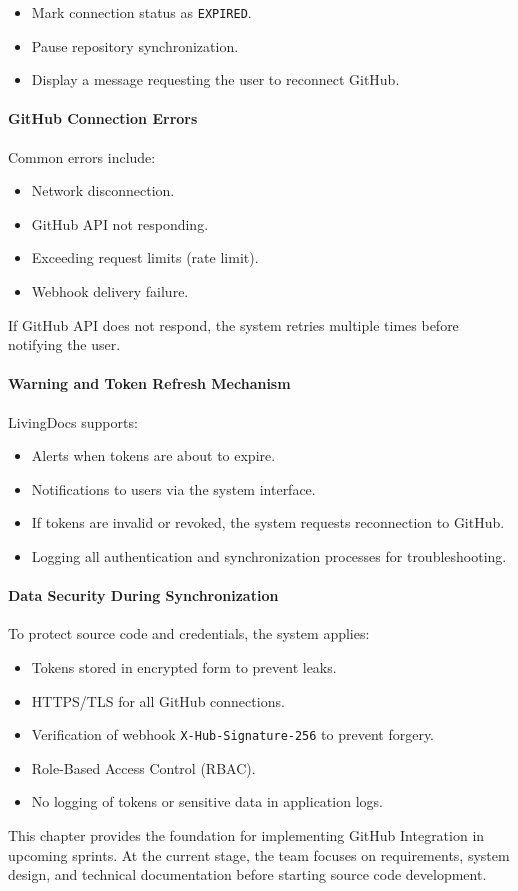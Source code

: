 \begin{itemize}
    \item Mark connection status as \texttt{EXPIRED}.
    \item Pause repository synchronization.
    \item Display a message requesting the user to reconnect GitHub.
\end{itemize}

\paragraph{GitHub Connection Errors}

Common errors include:

\begin{itemize}
    \item Network disconnection.
    \item GitHub API not responding.
    \item Exceeding request limits (rate limit).
    \item Webhook delivery failure.
\end{itemize}

If GitHub API does not respond, the system retries multiple times before notifying the user.

\paragraph{Warning and Token Refresh Mechanism}

LivingDocs supports:

\begin{itemize}
    \item Alerts when tokens are about to expire.
    \item Notifications to users via the system interface.
    \item If tokens are invalid or revoked, the system requests reconnection to GitHub.
    \item Logging all authentication and synchronization processes for troubleshooting.
\end{itemize}

\paragraph{Data Security During Synchronization}

To protect source code and credentials, the system applies:

\begin{itemize}
    \item Tokens stored in encrypted form to prevent leaks.
    \item HTTPS/TLS for all GitHub connections.
    \item Verification of webhook \texttt{X-Hub-Signature-256} to prevent forgery.
    \item Role-Based Access Control (RBAC).
    \item No logging of tokens or sensitive data in application logs.
\end{itemize}

This chapter provides the foundation for implementing GitHub Integration in upcoming sprints. At the current stage, the team focuses on requirements, system design, and technical documentation before starting source code development.
